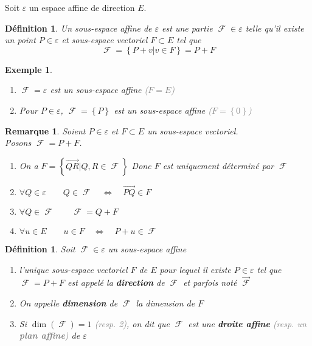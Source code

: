 \documentclass[a4paper, oneside]{report}
\theoremstyle{break}
\newtheorem{definition}[thm]{Définition}
\newtheorem{exemple}[thm]{Exemple}
\newtheorem{remarque}[thm]{Remarque}
\newcommand{\gray}[1]{\textcolor{gray}{#1}}
\DeclareMathOperator{\F}{\mathcal{F}}
\DeclarePairedDelimiter\ens{\left\{ }{\right\} }%
\renewcommand{\ens}[1]{\left\{ #1 \right\} }%
\newcommand{\slign}{\textbf}
\newcommand{\Ens}{\ens}
\newcommand{\ensF}{\F}
\begin{document}
Soit $\varepsilon$ un espace affine de direction $E$.

\begin{definition}
Un sous-espace affine de $\varepsilon$ est une partie $\ensF \in \varepsilon$ telle qu'il existe un point $P \in \varepsilon$ et sous-espace vectoriel $F \subset E$ tel que
\[
\ensF = \Ens{P + v \big| v \in F} = P + F
\]
\end{definition}

\begin{exemple}
\begin{enumerate}
\item  $\ensF = \varepsilon$ est un sous-espace affine \gray{($F = E$)}

\medbreak

\item  Pour $P \in \varepsilon$, $\ensF = \ens{P}$ est un sous-espace affine \gray{($F = \ens{0}$)}
\end{enumerate}
\end{exemple}

\begin{remarque}
Soient $P \in \varepsilon$ et $F \subset E$ un sous-espace vectoriel.\\
Posons $\ensF = P + F$.
\begin{enumerate}
\item On a $F = \Ens{\vec{QR} \big| Q, R \in \ensF}$
\newline
Donc $F$ est uniquement déterminé par $\ensF$

\item $\forall Q \in \varepsilon		\qquad	Q \in \ensF		\quad	\Leftrightarrow	\quad	\vec{PQ} \in F$

\item $\forall Q \in \ensF				\qquad	\ensF = Q + F$

\item $\forall u \in E					\qquad	u \in F	\quad	\Leftrightarrow	\quad	P + u \in \ensF$
\end{enumerate}
\end{remarque}

\begin{definition}
Soit $\ensF \in \varepsilon$ un sous-espace affine
\begin{enumerate}
\item l'unique sous-espace vectoriel $F$ de $E$ pour lequel il existe $P \in \varepsilon$ tel que $\ensF = P + F$ est appelé la \slign{direction} de $\ensF$ et parfois noté $\vec{\ensF}$

\item On appelle \slign{dimension} de $\ensF$ la dimension de $F$

\item Si $\dim(\ensF) = 1$ \gray{(resp. 2)}, on dit que $\ensF$ est une \slign{droite affine} \gray{(resp. un \slign{plan affine})} de $\varepsilon$
\end{enumerate}
\end{definition}
\end{document}
